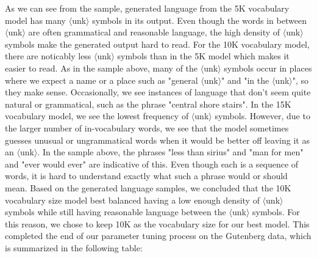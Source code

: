 \documentclass[a4paper]{article}
\begin{document}
As we can see from the sample, generated language from the 5K vocabulary model has many $\langle$unk$\rangle$ symbols in its output. Even though the words in between $\langle$unk$\rangle$ are often grammatical and reasonable language, the high density of $\langle$unk$\rangle$ symbols make the generated output hard to read.
\newline
\newline
For the 10K vocabulary model, there are noticably less $\langle$unk$\rangle$ symbols than in the 5K model which makes it easier to read. As in the sample above, many of the $\langle$unk$\rangle$ symbols occur in places where we expect a name or a place such as "general $\langle$unk$\rangle$" and "in the $\langle$unk$\rangle$", so they make sense. Occasionally, we see instances of language that don't seem quite natural or grammatical, such as the phrase "central shore stairs".
\newline
\newline
In the 15K vocabulary model, we see the lowest frequency of $\langle$unk$\rangle$ symbols. However, due to the larger number of in-vocabulary words, we see that the model sometimes guesses unusual or ungrammatical words when it would be better off leaving it as an $\langle$unk$\rangle$. In the sample above, the phrases "less than sirius" and "man for men" and "ever would ever" are indicative of this. Even though each is a sequence of words, it is hard to understand exactly what such a phrase would or should mean. 
\newline
\newline
Based on the generated language samples, we concluded that the 10K vocabulary size model best balanced having a low enough density of $\langle$unk$\rangle$ symbols while still having reasonable language between the $\langle$unk$\rangle$ symbols. For this reason, we chose to keep 10K as the vocabulary size for our best model. This completed the end of our parameter tuning process on the Gutenberg data, which is summarized in the following table:
\end{document}
